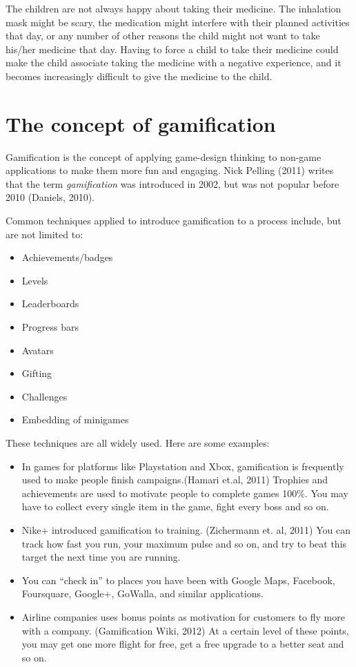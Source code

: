 The children are not always happy about taking their medicine. The inhalation mask might be scary, the 
medication might interfere with their planned activities that day, or any number of other reasons the child 
might not want to take his/her medicine that day. Having to force a child to take their medicine could make the 
child associate taking the medicine with a negative experience, and it becomes increasingly difficult to 
give the medicine to the child. 

\section{The concept of gamification}

Gamification is the concept of applying game-design thinking to non-game applications to make them more fun 
and engaging. Nick Pelling (2011)\cite{pellingblog} writes that the term \emph{gamification} was introduced
in 2002, but was not popular before 2010 (Daniels, 2010\cite{danielsblog}).

Common techniques applied to introduce gamification to a process include, but are not limited to:
\begin{itemize}
  \item Achievements/badges
  \item Levels
  \item Leaderboards
  \item Progress bars
  \item Avatars
  \item Gifting
  \item Challenges
  \item Embedding of minigames
\end{itemize}

These techniques are all widely used. Here are some examples:
\begin{itemize}
  \item In games for platforms like Playstation and Xbox, gamification is frequently used
   to make people finish campaigns.(Hamari et.al, 2011\cite{trophies}) Trophies and achievements are used to motivate people to complete games 100\%. 
   You may have to collect every single item in the game, fight every boss and so on.
  \item Nike+ introduced gamification to training. (Zichermann et. al, 2011\cite{gamificationByDesign}) You can track how fast you run, your maximum pulse and so on, 
  and try to beat this target the next time you are running.
  \item You can ``check in'' to places you have been with Google Maps, Facebook, Foursquare, Google+, GoWalla, and similar applications.  
  \item Airline companies uses bonus points as motivation for customers to fly more with a company. (Gamification Wiki, 2012\cite{freqflyer}) At a certain 
  level of these points, you may get one more flight for free, get a free upgrade to a better seat and so on. 
\end{itemize} 

